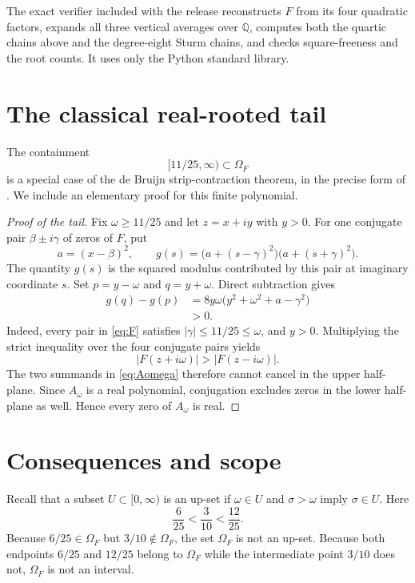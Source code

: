 \documentclass[11pt]{article}
\newcommand{\OmegaF}{\Omega_F}
\begin{document}
The exact verifier included with the release reconstructs $F$ from its four
quadratic factors, expands all three vertical averages over $\mathbb{Q}$,
computes both the quartic chains above and the degree-eight Sturm chains, and
checks square-freeness and the root counts. It uses only the Python standard
library.

\section{The classical real-rooted tail}

The containment
\[
  [11/25,\infty)\subset\OmegaF
\]
is a special case of the de Bruijn strip-contraction theorem, in the precise
form of \cite[Theorem 1.6]{BrandenChasse2017}. We include an elementary proof
for this finite polynomial.

\begin{proof}[Proof of the tail]
Fix $\omega\geq11/25$ and let $z=x+iy$ with $y>0$. For one conjugate pair
$\beta\mathbin{\pm}i\gamma$ of zeros of $F$, put
\[
  a=(x-\beta)^2,
  \qquad
  g(s)=\bigl(a+(s-\gamma)^2\bigr)
       \bigl(a+(s+\gamma)^2\bigr).
\]
The quantity $g(s)$ is the squared modulus contributed by this pair at
imaginary coordinate $s$. Set $p=y-\omega$ and $q=y+\omega$. Direct
subtraction gives
\begin{align*}
  g(q)-g(p)
  &=8y\omega\bigl(y^2+\omega^2+a-\gamma^2\bigr)\\
  &>0.
\end{align*}
Indeed, every pair in \eqref{eq:F} satisfies
$|\gamma|\leq11/25\leq\omega$, and $y>0$. Multiplying the strict inequality
over the four conjugate pairs yields
\[
  |F(z+i\omega)|>|F(z-i\omega)|.
\]
The two summands in \eqref{eq:Aomega} therefore cannot cancel in the upper
half-plane. Since $A_\omega$ is a real polynomial, conjugation excludes zeros
in the lower half-plane as well. Hence every zero of $A_\omega$ is real.
\end{proof}

\section{Consequences and scope}

Recall that a subset $U\subset[0,\infty)$ is an up-set if
$\omega\in U$ and $\sigma>\omega$ imply $\sigma\in U$. Here
\[
  \frac6{25}<\frac3{10}<\frac{12}{25}.
\]
Because $6/25\in\OmegaF$ but $3/10\notin\OmegaF$, the set $\OmegaF$ is not
an up-set. Because both endpoints $6/25$ and $12/25$ belong to $\OmegaF$
while the intermediate point $3/10$ does not, $\OmegaF$ is not an interval.
\end{document}
